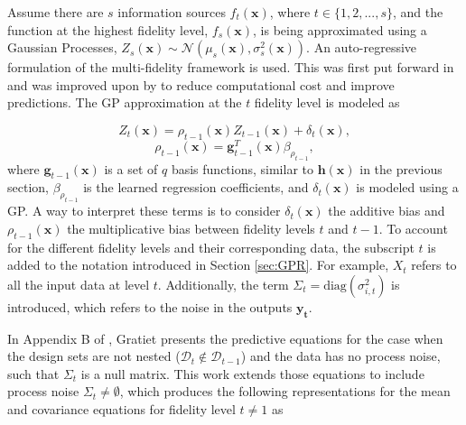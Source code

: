 Assume there are $s$ information sources $f_t(\mathbf{x})$, where $t\in\{1,2,...,s\}$, and the function at the highest fidelity level, $f_s(\mathbf{x})$, is being approximated using a Gaussian Processes, $Z_s(\mathbf{x}) \sim \mathcal{N}(\mu_{s}(\mathbf{x}), \sigma_s^2(\mathbf{x}))$. An auto-regressive formulation of the multi-fidelity framework is used. This was first put forward in \cite{kennedy_predicting_2000} and was improved upon by \cite{gratiet_multi-fidelity_nodate} to reduce computational cost and improve predictions. The GP approximation at the $t$ fidelity level is modeled as

\begin{equation}
    Z_t(\mathbf{x}) = \rho_{t-1}(\mathbf{x})Z_{t-1}(\mathbf{x}) + \delta_t(\mathbf{x}),
\end{equation}
\begin{equation}
    \rho_{t-1}(\mathbf{x}) = \mathbf{g}_{t-1}^T(\mathbf{x})\beta_{\rho_{t-1}},
\end{equation}
where $\mathbf{g}_{t-1}(\mathbf{x})$ is a set of $q$ basis functions, similar to $\mathbf{h}(\mathbf{x})$ in the previous section, $\beta_{\rho_{t-1}}$ is the learned regression coefficients, and $\delta_t(\mathbf{x})$ is modeled using a GP. A way to interpret these terms is to consider $\delta_t(\mathbf{x})$ the additive bias and $\rho_{t-1}(\mathbf{x})$ the multiplicative bias between fidelity levels $t$ and $t-1$. To account for the different fidelity levels and their corresponding data, the subscript $t$ is added to the notation introduced in Section \ref{sec:GPR}. For example, $X_t$ refers to all the input data at level $t$. Additionally, the term $\Sigma_t = \text{diag}(\sigma^2_{i,t})$ is introduced, which refers to the noise in the outputs $\mathbf{y_t}$. 

In Appendix B of \cite{gratiet_multi-fidelity_nodate}, Gratiet presents the predictive equations for the case when the design sets are not nested ($\mathcal{D}_t \notin \mathcal{D}_{t-1}$) and the data has no process noise, such that $\Sigma_t$ is a null matrix. This work extends those equations to include process noise $\Sigma_t \neq \emptyset$, which produces the following representations for the mean and covariance equations for fidelity level $t \neq 1$ as

